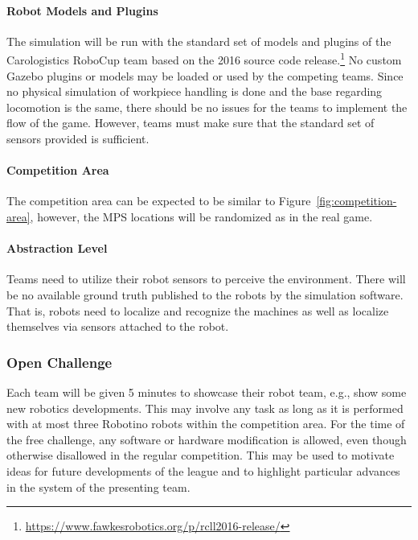 \documentclass[12pt,twoside]{article}
\begin{document}
\vspace{-2ex}\paragraph{Robot Models and Plugins}
%
The simulation will be run with the standard set of models and plugins
of the Carologistics RoboCup team based on the 2016 source code
release.\footnote{\url{https://www.fawkesrobotics.org/p/rcll2016-release/}} No
custom Gazebo plugins or models may be loaded or used by the competing
teams. Since no physical simulation of workpiece handling is done and
the base regarding locomotion is the same, there should be no
issues for the teams to implement the flow of the game. However, teams must
make sure that the standard set of sensors
provided is sufficient.

\vspace{-2ex}\paragraph{Competition Area} The competition area can be
expected to be similar to Figure~\ref{fig:competition-area}, however,
the MPS locations will be randomized as in the real game.

\vspace{-2ex}\paragraph{Abstraction Level} Teams need to utilize their
robot sensors to perceive the environment. There will be no available
ground truth published to the robots by the simulation software. That
is, robots need to localize and recognize the machines as well as
localize themselves via sensors attached to the robot.


\subsubsection{Open Challenge~}
Each team will be given 5 minutes to showcase their robot team, e.g.,
show some new robotics developments. This may involve any task as long
as it is performed with at most three Robotino robots within the
competition area. For the time of the free challenge, any software or
hardware modification is allowed, even though otherwise disallowed in
the regular competition. This may be used to motivate ideas for future
developments of the league and to highlight particular advances in the
system of the presenting team.
\end{document}
